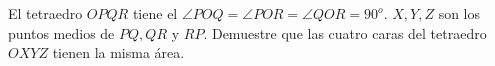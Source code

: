 El tetraedro $OPQR$ tiene el $\angle POQ = \angle POR = \angle QOR = 90^o$. $X, Y, Z$ son los puntos medios de $PQ, QR$ y $RP.$ Demuestre que las cuatro caras del tetraedro $OXYZ$ tienen la misma área. 
